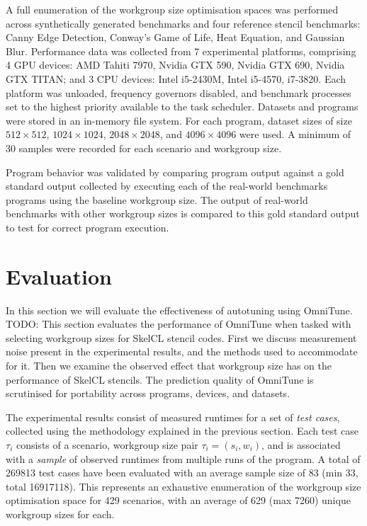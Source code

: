 \documentclass[nonatbib,preprint,9pt]{sigplanconf}
\begin{document}
A full enumeration of the workgroup size optimisation spaces was
performed across synthetically generated benchmarks and four reference
stencil benchmarks: Canny Edge Detection, Conway's Game of Life, Heat
Equation, and Gaussian Blur. Performance data was collected from 7
experimental platforms, comprising 4 GPU devices: AMD Tahiti 7970,
Nvidia GTX 590, Nvidia GTX 690, Nvidia GTX TITAN; and 3 CPU devices:
Intel i5-2430M, Intel i5-4570, i7-3820. Each platform was unloaded,
frequency governors disabled, and benchmark processes set to the
highest priority available to the task scheduler. Datasets and
programs were stored in an in-memory file system. For each program,
dataset sizes of size $512\times512$, $1024\times1024$,
$2048\times2048$, and $4096\times4096$ were used. A minimum of 30
samples were recorded for each scenario and workgroup size.

Program behavior was validated by comparing program output against a
gold standard output collected by executing each of the real-world
benchmarks programs using the baseline workgroup size. The output of
real-world benchmarks with other workgroup sizes is compared to this
gold standard output to test for correct program execution.


\section{Evaluation}\label{sec:evaluation}

In this section we will evaluate the effectiveness of autotuning using
OmniTune. TODO: This section evaluates the performance of OmniTune
when tasked with selecting workgroup sizes for SkelCL stencil
codes. First we discuss measurement noise present in the experimental
results, and the methods used to accommodate for it. Then we examine
the observed effect that workgroup size has on the performance of
SkelCL stencils. The prediction quality of OmniTune is scrutinised for
portability across programs, devices, and datasets.

The experimental results consist of measured runtimes for a set of
\emph{test cases}, collected using the methodology explained in the
previous section. Each test case $\tau_i$ consists of a scenario,
workgroup size pair $\tau_i = (s_i,w_i)$, and is associated with a
\emph{sample} of observed runtimes from multiple runs of the
program. A total of 269813 test cases have been evaluated with an
average sample size of 83 (min 33, total 16917118). This represents an
exhaustive enumeration of the workgroup size optimisation space for
429 scenarios, with an average of 629 (max 7260) unique workgroup
sizes for each.
\end{document}
